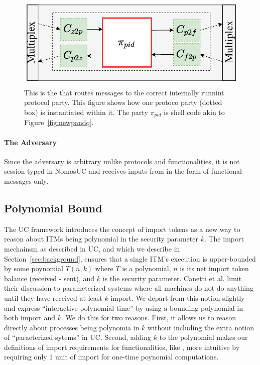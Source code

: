 \begin{figure}
	\centering
	\includegraphics[scale=0.5]{figures/singleshellmultiplex.pdf}
	\caption{This is the \partywrapper that routes messages to the correct internally runnint protocol party. This figure shows how one protoco party (dotted box) is instantiated within it. The party $\pi_{pid}$ is shell code akin to Figure~\ref{fig:newpandq}.}%
	\label{fig:singlemultiplex}
	\vspace{-3mm}
\end{figure}


\paragraph*{\textbf{The Adversary}}
Since the adversary is arbitrary unlike protocols and functionalities, it is not session-typed in NomosUC and receives inputs from \Z in the form of functional messages only.

\subsection{Polynomial Bound}
The UC framework introduces the concept of import tokens as a new way to reason about ITMs being polynomial in the security parameter $k$. 
The import mechainsm as described in UC, and which we describe in Section~\ref{sec:background}, ensures that a single ITM's execution is upper-bounded by some poynomial $T(n,k)$ where $T$ is a polynomial, $n$ is its net import token balance (received - sent), and $k$ is the security parameter.
Canetti et al. limit their discussion to parameterized systems where all machines do not do anything until they have received at least $k$ import.
We depart from this notion slightly and express ``interactive polynomial time'' by using a bounding polynomial in both import and $k$.
We do this for two reasons.
First, it allows us to reason directly about processes being polynomia in $k$ without including the extra notion of ``paraeterized sytems'' in UC.
Second, adding $k$ to the polynomial makes our definitions of import requirements for functionalities, like \Fro, more intuitive by requiring only 1 unit of import for one-time poynomial computations.

